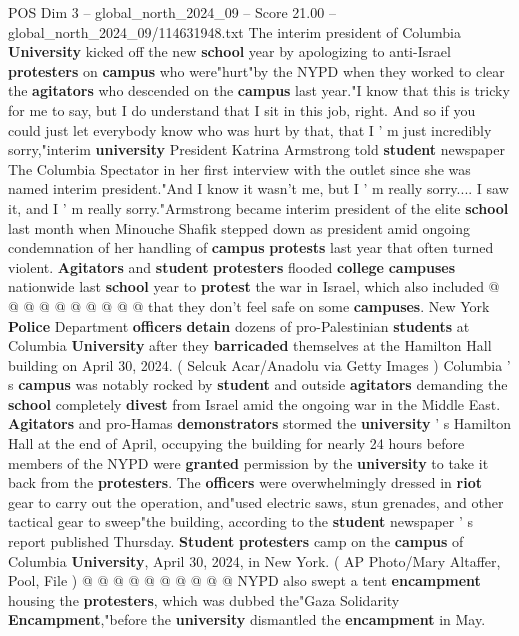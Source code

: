 \begin{textsample}{POS Dim 3 – global\_north\_2024\_09 – Score 21.00 – global\_north\_2024\_09/114631948.txt}  \label{ex:f3_pos_160}
The interim president of Columbia \textbf{University} kicked off the new \textbf{school} year by apologizing to anti-Israel \textbf{protesters} on \textbf{campus} who were"hurt"by the NYPD when they worked to clear the \textbf{agitators} who descended on the \textbf{campus} last year."I know that this is tricky for me to say, but I do understand that I sit in this job, right.
And so if you could just let everybody know who was hurt by that, that I ' m just incredibly sorry,"interim \textbf{university} President Katrina Armstrong told \textbf{student} newspaper The Columbia Spectator in her first interview with the outlet since she was named interim president."And I know it wasn't me, but I ' m really sorry....
I saw it, and I ' m really sorry."Armstrong became interim president of the elite \textbf{school} last month when Minouche Shafik stepped down as president amid ongoing condemnation of her handling of \textbf{campus} \textbf{protests} last year that often turned violent. \textbf{Agitators} and \textbf{student} \textbf{protesters} flooded \textbf{college} \textbf{campuses} nationwide last \textbf{school} year to \textbf{protest} the war in Israel, which also included @ @ @ @ @ @ @ @ @ @ that they don't feel safe on some \textbf{campuses}.
New York \textbf{Police} Department \textbf{officers} \textbf{detain} dozens of pro-Palestinian \textbf{students} at Columbia \textbf{University} after they \textbf{barricaded} themselves at the Hamilton Hall building on April 30, 2024. ( Selcuk Acar/Anadolu via Getty Images ) Columbia ' s \textbf{campus} was notably rocked by \textbf{student} and outside \textbf{agitators} demanding the \textbf{school} completely \textbf{divest} from Israel amid the ongoing war in the Middle East. \textbf{Agitators} and pro-Hamas \textbf{demonstrators} stormed the \textbf{university} ' s Hamilton Hall at the end of April, occupying the building for nearly 24 hours before members of the NYPD were \textbf{granted} permission by the \textbf{university} to take it back from the \textbf{protesters}.
The \textbf{officers} were overwhelmingly dressed in \textbf{riot} gear to carry out the operation, and"used electric saws, stun grenades, and other tactical gear to sweep"the building, according to the \textbf{student} newspaper ' s report published Thursday. \textbf{Student} \textbf{protesters} camp on the \textbf{campus} of Columbia \textbf{University}, April 30, 2024, in New York. ( AP Photo/Mary Altaffer, Pool, File ) @ @ @ @ @ @ @ @ @ @ NYPD also swept a tent \textbf{encampment} housing the \textbf{protesters}, which was dubbed the"Gaza Solidarity \textbf{Encampment},"before the \textbf{university} dismantled the \textbf{encampment} in May.

\end{textsample}
